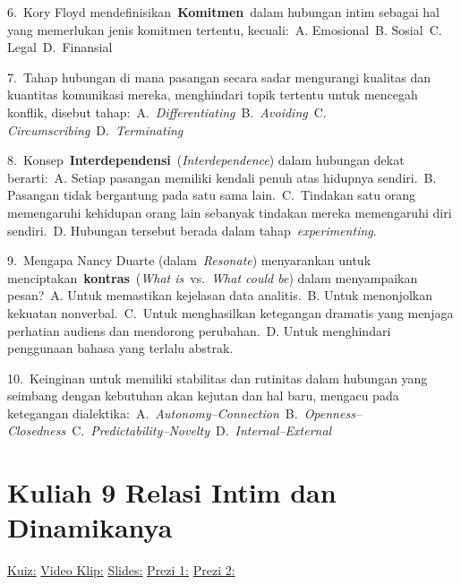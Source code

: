\documentclass[
  letterpaper,
  DIV=11,
  numbers=noendperiod]{scrreprt}
\begin{document}
6.~Kory Floyd mendefinisikan~\textbf{Komitmen}~dalam hubungan intim
sebagai hal yang memerlukan jenis komitmen tertentu, kecuali:~A.
Emosional~B. Sosial~C. Legal~D.~Finansial

7.~Tahap hubungan di mana pasangan secara sadar mengurangi kualitas dan
kuantitas komunikasi mereka, menghindari topik tertentu untuk mencegah
konflik, disebut tahap:~A.~\emph{Differentiating}~B.~\emph{Avoiding}~C.~
\emph{Circumscribing}~D.~\emph{Terminating}

8.~Konsep~\textbf{Interdependensi}~(\emph{Interdependence}) dalam
hubungan dekat berarti:~A. Setiap pasangan memiliki kendali penuh atas
hidupnya sendiri.~B. Pasangan tidak bergantung pada satu sama
lain.~C.~Tindakan satu orang memengaruhi kehidupan orang lain sebanyak
tindakan mereka memengaruhi diri sendiri.~D. Hubungan tersebut berada
dalam tahap~\emph{experimenting}.

9.~Mengapa Nancy Duarte (dalam~\emph{Resonate}) menyarankan untuk
menciptakan~\textbf{kontras}~(\emph{What is}~vs.~\emph{What could be})
dalam menyampaikan pesan?~A. Untuk memastikan kejelasan data
analitis.~B. Untuk menonjolkan kekuatan nonverbal.~C.~Untuk menghasilkan
ketegangan dramatis yang menjaga perhatian audiens dan mendorong
perubahan.~D. Untuk menghindari penggunaan bahasa yang terlalu abstrak.

10.~Keinginan untuk memiliki stabilitas dan rutinitas dalam hubungan
yang seimbang dengan kebutuhan akan kejutan dan hal baru, mengacu pada
ketegangan
dialektika:~A.~\emph{Autonomy--Connection}~B.~\emph{Openness--Closedness}~C.~\emph{Predictability--Novelty}~D.~\emph{Internal--External}


\chapter{Kuliah 9 Relasi Intim dan
Dinamikanya}\label{kuliah-9-relasi-intim-dan-dinamikanya}

\href{https://forms.office.com/r/GrJmQCemqf}{Kuiz:}
\href{https://youtube.com/playlist?list=PL_m-BplfO92Eo7pAbganlvf9dpGIFt36D&si=CDA5GUdwZcoRfZkX}{Video
Klip:}
\href{https://gamma.app/docs/Modul-Pelatihan-Menguasai-Komunikasi-untuk-Membangun-Hubungan-yan-7zcsnrjtnw2xn89}{Slides:}
\href{https://prezi.com/view/bICCOPu1tObyaTyIMwl8/?referral_token=gtQQVXlnB3FN}{Prezi
1:}
\href{https://prezi.com/view/8wSjXOx6WDuusNPU4Z36/?referral_token=gtQQVXlnB3FN}{Prezi
2:}

\end{document}

